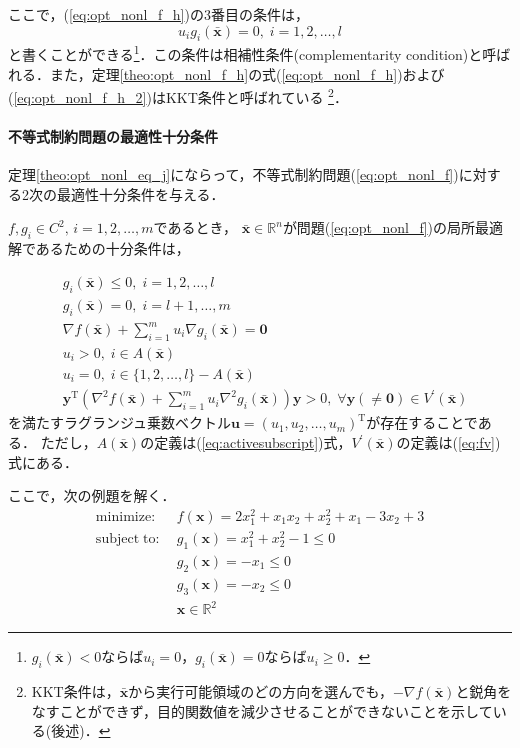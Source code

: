 \documentclass{jsreport}
\begin{document}
ここで，(\ref{eq:opt_nonl_f_h})の3番目の条件は，
\begin{equation}\label{eq:comp}
  u_i g_i(\bar{\bm{x}}) = 0, \; i = 1, 2, \ldots, l
\end{equation}
と書くことができる\footnote{$g_i(\bar{\bm{x}}) < 0$ならば$u_i = 0$，$g_i(\bar{\bm{x}}) = 0$ならば$u_i \geq 0$．}．この条件は相補性条件(complementarity condition)と呼ばれる．また，定理\ref{theo:opt_nonl_f_h}の式(\ref{eq:opt_nonl_f_h})および(\ref{eq:opt_nonl_f_h_2})はKKT条件と呼ばれている
\footnote{KKT条件は，$\bar{\bm{x}}$から実行可能領域のどの方向を選んでも，$-\nabla f(\bar{\bm{x}})$と鋭角をなすことができず，目的関数値を減少させることができないことを示している(後述)．}．

\paragraph{不等式制約問題の最適性十分条件}
定理\ref{theo:opt_nonl_eq_j}にならって，不等式制約問題(\ref{eq:opt_nonl_f})に対する2次の最適性十分条件を与える．
\begin{theo}\label{theo:opt_nonl_f_j}
  $f, g_i \in C^2, \, i = 1, 2, \ldots, m$であるとき，
  $\bar{\bm{x}} \in \mathbb{R}^n$が問題(\ref{eq:opt_nonl_f})の局所最適解であるための十分条件は，

  \begin{align}
    &g_i(\bar{\bm{x}}) \leq 0, \; i = 1, 2, \ldots, l \nonumber \\
    &g_i(\bar{\bm{x}}) = 0, \; i = l + 1, \ldots, m \nonumber \\
    &\nabla f(\bar{\bm{x}}) + \sum_{i = 1}^m u_i \nabla g_i(\bar{\bm{x}}) = \bm{0} \nonumber \\
    &u_i > 0, \; i \in A(\bar{\bm{x}}) \nonumber \\
    &u_i = 0, \; i \in \{1, 2, \ldots, l\} - A(\bar{\bm{x}}) \nonumber \\
    &\bm{y}^{\mathrm{T}} \left({\nabla}^2 f(\bar{\bm{x}}) + \sum_{i = 1}^m u_i {\nabla}^2 g_i(\bar{\bm{x}})\right) \bm{y} > 0, \; \forall \bm{y}(\neq \bm{0}) \in V^{\prime}(\bar{\bm{x}})
  \end{align}
  を満たすラグランジュ乗数ベクトル$\bm{u} = (u_1, u_2, \ldots, u_m)^{\mathrm{T}}$が存在することである．
  ただし，$A(\bar{\bm{x}})$の定義は(\ref{eq:activesubscript})式，$V^{\prime}(\bar{\bm{x}})$の定義は(\ref{eq:fv})式にある．
\end{theo}

ここで，次の例題を解く．
\begin{align}
  \mathrm{minimize} : \; &f(\bm{x}) = 2x_1^2 + x_1 x_2 + x_2^2 + x_1 - 3x_2 + 3 \nonumber\\
  \mathrm{subject \; to} : \; &g_1(\bm{x}) = x_1^2 + x_2^2 - 1 \leq 0 \nonumber \\
  &g_2(\bm{x}) = -x_1 \leq 0 \nonumber \\
  &g_3(\bm{x}) = -x_2 \leq 0 \nonumber \\
  &\bm{x} \in \mathbb{R}^2 \nonumber
\end{align}
\end{document}
